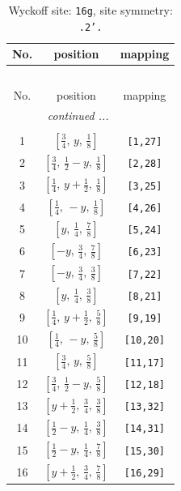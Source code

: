 \documentclass[fleqn,8pt]{jsarticle}
\begin{document}
\renewcommand{\arraystretch}{1.2}
\begin{longtable}{ccc}
\caption{Wyckoff site: {\tt 16g}, site symmetry: {\tt .2'.}}
 \\
 \hline \hline
No. & position & mapping \\ \hline \endfirsthead

\multicolumn{2}{l}{\tablename\ \thetable{}} \\
 \hline \hline
No. & position & mapping \\ \hline \endhead

 \hline \hline
\multicolumn{2}{r}{\footnotesize\it continued ...} \\ \endfoot

 \hline \hline
\multicolumn{2}{r}{} \\ \endlastfoot

1 & $\left[ \frac{3}{4},\, y,\, \frac{1}{8} \right]$ & {\tt [1,27]} \\ \hline
2 & $\left[ \frac{3}{4},\, \frac{1}{2} - y,\, \frac{1}{8} \right]$ & {\tt [2,28]} \\ \hline
3 & $\left[ \frac{1}{4},\, y + \frac{1}{2},\, \frac{1}{8} \right]$ & {\tt [3,25]} \\ \hline
4 & $\left[ \frac{1}{4},\, - y,\, \frac{1}{8} \right]$ & {\tt [4,26]} \\ \hline
5 & $\left[ y,\, \frac{1}{4},\, \frac{7}{8} \right]$ & {\tt [5,24]} \\ \hline
6 & $\left[ - y,\, \frac{3}{4},\, \frac{7}{8} \right]$ & {\tt [6,23]} \\ \hline
7 & $\left[ - y,\, \frac{3}{4},\, \frac{3}{8} \right]$ & {\tt [7,22]} \\ \hline
8 & $\left[ y,\, \frac{1}{4},\, \frac{3}{8} \right]$ & {\tt [8,21]} \\ \hline
9 & $\left[ \frac{1}{4},\, y + \frac{1}{2},\, \frac{5}{8} \right]$ & {\tt [9,19]} \\ \hline
10 & $\left[ \frac{1}{4},\, - y,\, \frac{5}{8} \right]$ & {\tt [10,20]} \\ \hline
11 & $\left[ \frac{3}{4},\, y,\, \frac{5}{8} \right]$ & {\tt [11,17]} \\ \hline
12 & $\left[ \frac{3}{4},\, \frac{1}{2} - y,\, \frac{5}{8} \right]$ & {\tt [12,18]} \\ \hline
13 & $\left[ y + \frac{1}{2},\, \frac{3}{4},\, \frac{3}{8} \right]$ & {\tt [13,32]} \\ \hline
14 & $\left[ \frac{1}{2} - y,\, \frac{1}{4},\, \frac{3}{8} \right]$ & {\tt [14,31]} \\ \hline
15 & $\left[ \frac{1}{2} - y,\, \frac{1}{4},\, \frac{7}{8} \right]$ & {\tt [15,30]} \\ \hline
16 & $\left[ y + \frac{1}{2},\, \frac{3}{4},\, \frac{7}{8} \right]$ & {\tt [16,29]} \\
\end{longtable}
\end{document}
